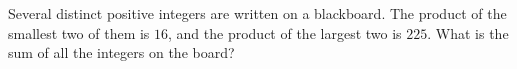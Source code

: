Several distinct positive integers are written on a blackboard. The product of the smallest two of them is $16$, and the product of the largest two is $225$. What is the sum of all the integers on the board?
